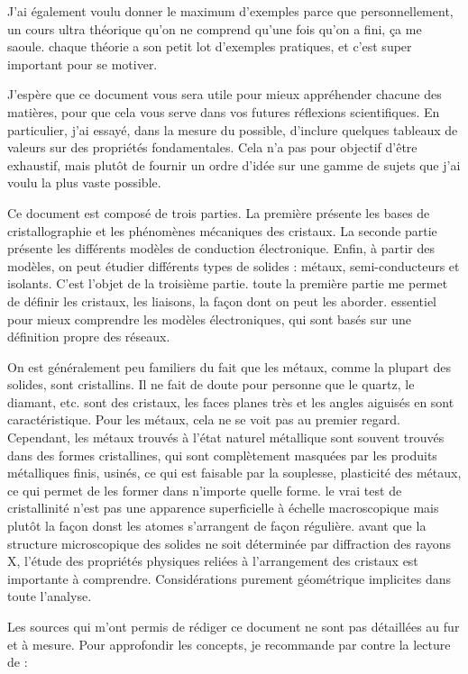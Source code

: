 \documentclass[a4paper,justified,twoside,nobib]{tufte-book}
\renewcommand{\=}[1]{\stackrel{#1}{=}} %
\begin{document}
J'ai également voulu donner le maximum d'exemples parce que personnellement, un 
cours ultra théorique qu'on ne comprend qu'une fois qu'on a fini, ça me saoule.
chaque théorie a son petit lot d'exemples pratiques, et c'est super important
pour se motiver.

J'espère que ce document vous sera utile pour mieux appréhender chacune des 
matières, pour que cela vous serve dans vos futures réflexions scientifiques.
En particulier, j'ai essayé, dans la mesure du possible, d'inclure quelques 
tableaux de valeurs sur des propriétés fondamentales. Cela n'a pas pour objectif
d'être exhaustif, mais plutôt de fournir un ordre d'idée sur une gamme de sujets
que j'ai voulu la plus vaste possible.

Ce document est composé de trois parties. La première présente les bases de
cristallographie et les phénomènes mécaniques des cristaux.
La seconde partie présente les différents modèles de conduction électronique.
Enfin, à partir des modèles, on peut étudier différents types de solides : 
métaux, semi-conducteurs et isolants. C'est l'objet de la troisième partie.
toute la première partie me permet de définir les cristaux, les liaisons, la
façon dont on peut les aborder. essentiel pour mieux comprendre les modèles 
électroniques, qui sont basés sur une définition propre des réseaux.

On est généralement peu familiers du fait que les métaux, comme la plupart des 
solides, sont cristallins. Il ne fait de doute pour personne que le quartz, le 
diamant, etc. sont des cristaux, les faces planes très et les angles aiguisés en
sont caractéristique. Pour les métaux, cela ne se voit pas au premier regard. 
Cependant, les métaux trouvés à l'état naturel métallique sont souvent trouvés 
dans des formes cristallines, qui sont complètement masquées par les produits
métalliques finis, usinés, ce qui est faisable par la souplesse, plasticité des 
métaux, ce qui permet de les former dans n'importe quelle forme.
le vrai test de cristallinité n'est pas une apparence superficielle à échelle 
macroscopique mais plutôt la façon donst les atomes s'arrangent de façon
régulière. avant que la structure microscopique des solides ne soit déterminée 
par diffraction des rayons X, l'étude des propriétés physiques reliées à 
l'arrangement des cristaux est importante à comprendre. Considérations purement
géométrique implicites dans toute l'analyse. 

Les sources qui m'ont permis de rédiger ce document ne sont pas détaillées au fur
et à mesure. Pour approfondir les concepts, je recommande par contre la lecture
de :
\end{document}
